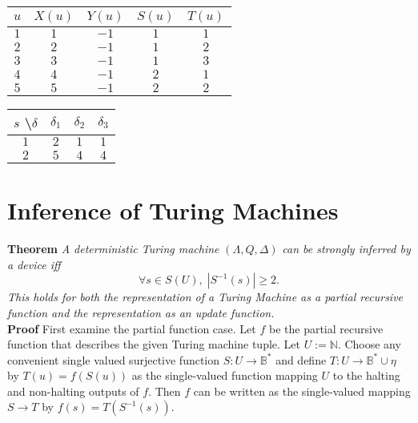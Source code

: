 \documentclass[11pt]{article}
\newcommand{\N}{\mathbb{N}}
\newcommand{\B}{\mathbb{B}}
\begin{document}
 \begin{center}
 \begin{tabular}{ |c||c|c|c|c| } 

 \hline
 $ u $ & $ X(u) $ & $ Y(u) $ & $ S(u) $ & $ T(u) $ \\ 
 \hline
 \hline
 $ 1 $ & $ 1 $ & $ -1 $ & $ 1 $ & $ 1 $ \\
 \hline
 $ 2 $ & $ 2 $ & $ -1 $ & $ 1 $ & $ 2 $ \\
 \hline
 $ 3 $ & $ 3 $ & $ -1 $ & $ 1 $ & $ 3 $ \\
 \hline
 $ 4 $ & $ 4 $ & $ -1 $ & $ 2 $ & $ 1 $ \\
 \hline
 $ 5 $ & $ 5 $ & $ -1 $ & $ 2 $ & $ 2 $ \\
 \hline
 \end{tabular} 
 \quad
 \begin{tabular}{ |c||c|c|c| } 

 \hline
 $ s $ \textbackslash $ \delta $ & $ \delta_1 $ & $ \delta_2 $ & $ \delta_3 $ \\ 
 \hline
 \hline
 $ 1 $ & $ 2 $ & $ 1 $ & $ 1 $  \\
  \hline
 $ 2 $ & $ 5 $ & $ 4 $ & $ 4 $  \\
 \hline
 
 \end{tabular}
 \end{center} 

\bigskip 
\bigskip
\section{Inference of Turing Machines}
\textbf{Theorem} \quad \textit{A deterministic Turing machine} $(\Lambda, Q, \Delta)$ \textit{can be strongly inferred by a device iff} 
$$\forall s \in S(U),\; |S^{-1}(s)| \geq 2. $$ \textit{This holds for both the representation of a Turing Machine as a partial recursive function and the representation as an update function.} \\

\textbf{Proof} \quad First examine the partial function case. Let $ f $ be the partial recursive function that describes the given Turing machine tuple. Let $ U := \N $. Choose any convenient single valued surjective function $ S: U \rightarrow \B^{*} $ and define $ T: U \rightarrow \B^{*} \cup \eta$ by $T(u) = f(S(u)) $ as the single-valued function mapping $ U $ to the halting and non-halting outputs of $ f $. Then $ f $ can be written as the single-valued mapping $ S \rightarrow T $ by $ f(s) = T(S^{-1}(s)) $. \\
\end{document}
